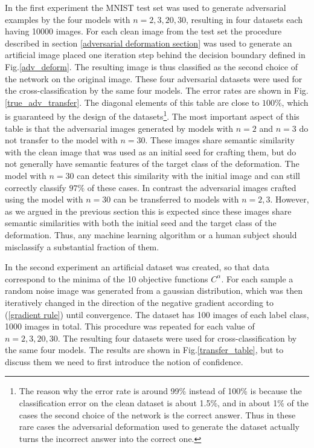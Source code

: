 In the first experiment the MNIST test set was used to generate adversarial examples by the four models with $n=2, 3, 20, 30$, resulting in four datasets each having 10000 images. For each clean image from the test set the procedure described in section \ref{adversarial deformation section} was used to generate an artificial image placed one iteration step behind the decision boundary defined in Fig.\ref{adv_deform}. The resulting image is thus classified as the second choice of the network on the original image. These four adversarial datasets were used for the cross-classification by the same four models. The error rates are shown in Fig.\ref{true_adv_transfer}. The diagonal elements of this table are close to $100\%$, which is guaranteed by the design of the datasets\footnote{The reason why the error rate is around 99\% instead of 100\% is because the classification error on the clean dataset is about 1.5\%, and in about 1\% of the cases the second choice of the network is the correct answer. Thus in these rare cases the adversarial deformation used to generate the dataset actually turns the incorrect answer into the correct one.}.  The most important aspect of this table is that the adversarial images generated by models with $n=2$ and $n=3$ do not transfer to the model with $n=30$. These images share semantic similarity with the clean image that was used as an initial seed for crafting them, but do not generally have semantic features of the target class of the deformation. The model with $n=30$ can detect this similarity with the initial image and can still correctly classify $97\%$ of these cases. In contrast the adversarial images crafted using the model with $n=30$ can be transferred to models with $n=2, 3$. However, as we argued in the previous section this is expected since these images share semantic similarities with both the initial seed and the target class of the deformation. Thus, any machine learning algorithm or a human subject should misclassify a substantial fraction of them.

In the second experiment an artificial dataset was created, so that data correspond to the minima of the 10  objective functions $C^\alpha$. For each sample a random noise image was generated from a gaussian distribution, which was then iteratively changed in the direction of the negative gradient according to (\ref{gradient rule}) until convergence. The dataset has 100 images of each label class, 1000 images in total. This procedure was repeated for each value of $n=2, 3, 20, 30$. The resulting four datasets were used for cross-classification by the same four models. The results are shown in Fig.\ref{transfer_table}, but to discuss them we need to first introduce the notion of confidence. 

